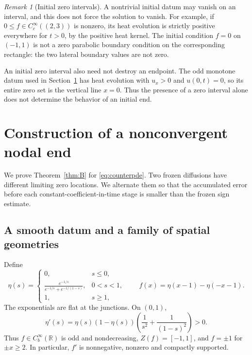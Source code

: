 \documentclass[11pt,reqno]{amsart}
\numberwithin{equation}{section}
\theoremstyle{definition}
\theoremstyle{remark}
\newtheorem{remark}[theorem]{Remark}
\newcommand{\R}{\mathbb R}
\begin{document}
\begin{remark}[Initial zero intervals]\label{rem:zerointerval}
A nontrivial initial datum may vanish on an interval, and this does not force the solution to vanish. For example, if $0\leq f\in C_c^\infty((2,3))$ is nonzero, its heat evolution is strictly positive everywhere for $t>0$, by the positive heat kernel. The initial condition $f=0$ on $(-1,1)$ is not a zero parabolic boundary condition on the corresponding rectangle: the two lateral boundary values are not zero.

An initial zero interval also need not destroy an endpoint. The odd monotone datum used in Section~\ref{sec:counter} has heat evolution with $u_x>0$ and $u(0,t)=0$, so its entire zero set is the vertical line $x=0$. Thus the presence of a zero interval alone does not determine the behavior of an initial end.
\end{remark}

\section{Construction of a nonconvergent nodal end}\label{sec:counter}
We prove Theorem~\ref{thm:B} for \eqref{eq:counterpde}. Two frozen diffusions have different limiting zero locations. We alternate them so that the accumulated error before each constant-coefficient-in-time stage is smaller than the frozen sign estimate.

\subsection{A smooth datum and a family of spatial geometries}
Define
\begin{equation}\label{eq:eta}
 \eta(s)=
 \begin{cases}
 0,&s\leq0,\\[2pt]
 \displaystyle\frac{e^{-1/s}}{e^{-1/s}+e^{-1/(1-s)}},&0<s<1,\\[6pt]
 1,&s\geq1,
 \end{cases}
 \qquad
 f(x)=\eta(x-1)-\eta(-x-1).
\end{equation}
The exponentials are flat at the junctions. On $(0,1)$,
\[
 \eta'(s)=\eta(s)(1-\eta(s))
 \left(\frac1{s^2}+\frac1{(1-s)^2}\right)>0.
\]
Thus $f\in C_b^\infty(\R)$ is odd and nondecreasing, $Z(f)=[-1,1]$, and $f=\pm1$ for $\pm x\geq2$. In particular, $f'$ is nonnegative, nonzero and compactly supported.
\end{document}
